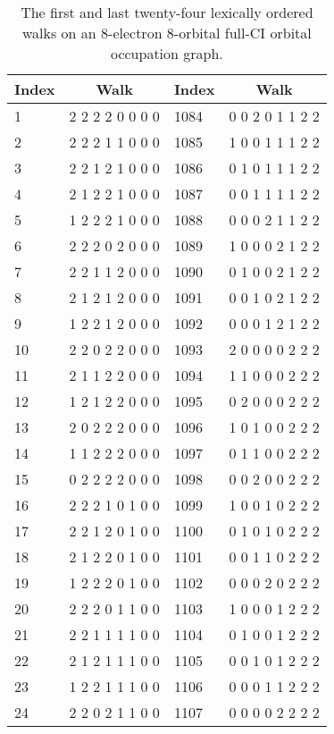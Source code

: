 \begin{table}[htbp]

\center

\begin{tabular}{lc|lc}
  Index  & Walk  & Index & Walk \\ \hline
   1 & 2 2 2 2 0 0 0 0   &1084 & 0 0 2 0 1 1 2 2 \\
   2 & 2 2 2 1 1 0 0 0   &1085 & 1 0 0 1 1 1 2 2 \\
   3 & 2 2 1 2 1 0 0 0   &1086 & 0 1 0 1 1 1 2 2 \\
   4 & 2 1 2 2 1 0 0 0   &1087 & 0 0 1 1 1 1 2 2 \\
   5 & 1 2 2 2 1 0 0 0   &1088 & 0 0 0 2 1 1 2 2 \\
   6 & 2 2 2 0 2 0 0 0   &1089 & 1 0 0 0 2 1 2 2 \\
   7 & 2 2 1 1 2 0 0 0   &1090 & 0 1 0 0 2 1 2 2 \\
   8 & 2 1 2 1 2 0 0 0   &1091 & 0 0 1 0 2 1 2 2 \\
   9 & 1 2 2 1 2 0 0 0   &1092 & 0 0 0 1 2 1 2 2 \\
  10 & 2 2 0 2 2 0 0 0   &1093 & 2 0 0 0 0 2 2 2 \\
  11 & 2 1 1 2 2 0 0 0   &1094 & 1 1 0 0 0 2 2 2 \\
  12 & 1 2 1 2 2 0 0 0   &1095 & 0 2 0 0 0 2 2 2 \\
  13 & 2 0 2 2 2 0 0 0   &1096 & 1 0 1 0 0 2 2 2 \\
  14 & 1 1 2 2 2 0 0 0   &1097 & 0 1 1 0 0 2 2 2 \\
  15 & 0 2 2 2 2 0 0 0   &1098 & 0 0 2 0 0 2 2 2 \\
  16 & 2 2 2 1 0 1 0 0   &1099 & 1 0 0 1 0 2 2 2 \\
  17 & 2 2 1 2 0 1 0 0   &1100 & 0 1 0 1 0 2 2 2 \\
  18 & 2 1 2 2 0 1 0 0   &1101 & 0 0 1 1 0 2 2 2 \\
  19 & 1 2 2 2 0 1 0 0   &1102 & 0 0 0 2 0 2 2 2 \\
  20 & 2 2 2 0 1 1 0 0   &1103 & 1 0 0 0 1 2 2 2 \\
  21 & 2 2 1 1 1 1 0 0   &1104 & 0 1 0 0 1 2 2 2 \\
  22 & 2 1 2 1 1 1 0 0   &1105 & 0 0 1 0 1 2 2 2 \\
  23 & 1 2 2 1 1 1 0 0   &1106 & 0 0 0 1 1 2 2 2 \\
  24 & 2 2 0 2 1 1 0 0   &1107 & 0 0 0 0 2 2 2 2 \\ \hline
\end{tabular}

\caption{\label{owalks} The first and last twenty-four lexically
ordered walks on an 8-electron 8-orbital full-CI orbital occupation graph.}
\end{table}

